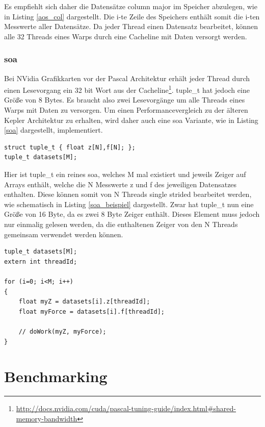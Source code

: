 Es empfiehlt sich daher die Datensätze column major im Speicher abzulegen, wie in Listing \ref{aos_col} dargestellt. Die i-te Zeile des Speichers enthält somit die i-ten Messwerte aller Datensätze. Da jeder Thread einen Datensatz bearbeitet, können alle 32 Threads eines Warps durch eine Cacheline mit Daten versorgt werden.


\subsection{\acrlong{soa}}
Bei NVidia Grafikkarten vor der Pascal Architektur erhält jeder Thread durch einen Lesevorgang ein 32 bit Wort aus der Cacheline\footnote{\href{http://docs.nvidia.com/cuda/pascal-tuning-guide/index.html\#shared-memory-bandwidth}{http://docs.nvidia.com/cuda/pascal-tuning-guide/index.html\#shared-memory-bandwidth}}. tuple\_t hat jedoch eine Größe von 8 Bytes. 
Es braucht also zwei Lesevorgänge um alle Threads eines Warps mit Daten zu versorgen.
Um einen Performancevergleich zu der älteren Kepler Architektur zu erhalten, wird daher auch eine \gls{soa} Variante, wie in Listing \ref{soa} dargestellt, implementiert.

\begin{lstlisting}[label=soa,caption=Datenlayout \gls{soa}]
struct tuple_t { float z[N],f[N]; };
tuple_t datasets[M];
\end{lstlisting}

Hier ist tuple\_t ein reines \gls{soa}, welches M mal existiert und jeweils Zeiger auf Arrays enthält, welche die N Messwerte z und f des jeweiligen Datensatzes enthalten. Diese können somit von N Threads single strided bearbeitet werden, wie schematisch in Listing \ref{soa_beispiel} dargestellt.
Zwar hat tuple\_t nun eine Größe von 16 Byte, da es zwei 8 Byte Zeiger enthält. Dieses Element muss jedoch nur einmalig gelesen werden, da die enthaltenen Zeiger von den N Threads gemeinsam verwendet werden können.

\begin{lstlisting}[label=soa_beispiel,caption=Bearbeitung eines \gls{soa}]
tuple_t datasets[M];
extern int threadId;

for (i=0; i<M; i++)
{
    float myZ = datasets[i].z[threadId];
    float myForce = datasets[i].f[threadId];
    
    // doWork(myZ, myForce);
}
\end{lstlisting}


\chapter{Benchmarking}
%
%


